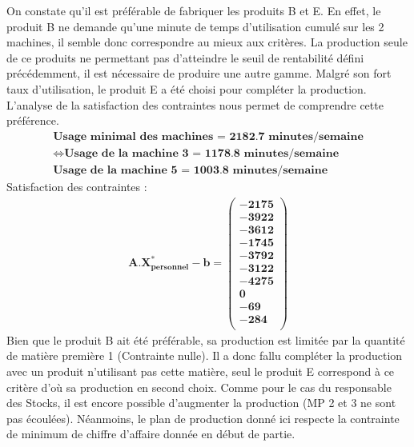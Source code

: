 \documentclass[12pt]{article}
\begin{document}
On constate qu'il est préférable de fabriquer les produits B et E. En effet, le produit B ne demande qu'une minute de temps d'utilisation cumulé sur les 2 machines, il semble donc correspondre au mieux aux critères. La production seule de ce produits ne permettant pas d'atteindre le seuil de rentabilité défini précédemment, il est nécessaire de produire une autre gamme. Malgré son fort taux d'utilisation, le produit E a été choisi pour compléter la production. L'analyse de la satisfaction des contraintes nous permet de comprendre cette préférence.
\begin{align*}
\textbf{Usage minimal des machines = 2182.7 minutes/semaine}\\
\Longleftrightarrow
\textbf{Usage de la machine 3 = 1178.8 minutes/semaine}\\
\textbf{Usage de la machine 5 = 1003.8 minutes/semaine}
\end{align*}
Satisfaction des contraintes : 
\begin{align*}
\boldsymbol{A.X^{*}_{personnel} - b = 
   \left (
   \begin{aligned}
      -2175 \\
      -3922 \\
      -3612 \\
      -1745 \\
      -3792 \\
      -3122 \\
      -4275 \\
      0 \\
      -69 \\
      -284\\
   \end{aligned}
   \right )
 } 
\end{align*}
Bien que le produit B ait été préférable, sa production est limitée par la quantité de matière première 1 (Contrainte nulle). Il a donc fallu compléter la production avec un produit n'utilisant pas cette matière, seul le produit E correspond à ce critère d'où sa production en second choix.
Comme pour le cas du responsable des Stocks, il est encore possible d'augmenter la production (MP 2 et 3 ne sont pas écoulées). Néanmoins, le plan de production donné ici respecte la contrainte de minimum de chiffre d'affaire donnée en début de partie.
\end{document}
